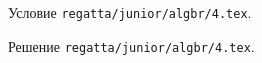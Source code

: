 Условие \texttt{regatta/junior/algbr/4.tex}.

\solution Решение \texttt{regatta/junior/algbr/4.tex}.
